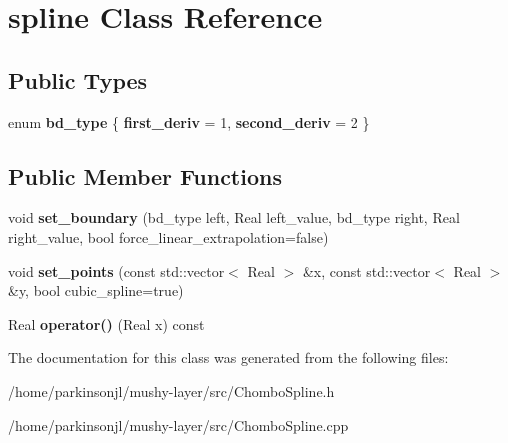 \hypertarget{classspline}{\section{spline Class Reference}
\label{classspline}
}
\subsection*{Public Types}
\begin{DoxyCompactItemize}
\item 
enum {\bfseries bd\-\_\-type} \{ {\bfseries first\-\_\-deriv} = 1, 
{\bfseries second\-\_\-deriv} = 2
 \}
\end{DoxyCompactItemize}
\subsection*{Public Member Functions}
\begin{DoxyCompactItemize}
\item 
\hypertarget{classspline_a8faa0e24c31c45b976606e1376e2eff2}{void {\bfseries set\-\_\-boundary} (bd\-\_\-type left, Real left\-\_\-value, bd\-\_\-type right, Real right\-\_\-value, bool force\-\_\-linear\-\_\-extrapolation=false)}\label{classspline_a8faa0e24c31c45b976606e1376e2eff2}

\item 
\hypertarget{classspline_abfb0f9a39a5c59e72aa59e0f1ce8cc6d}{void {\bfseries set\-\_\-points} (const std\-::vector$<$ Real $>$ \&x, const std\-::vector$<$ Real $>$ \&y, bool cubic\-\_\-spline=true)}\label{classspline_abfb0f9a39a5c59e72aa59e0f1ce8cc6d}

\item 
\hypertarget{classspline_a89cf037a96ee3d16af5f4d640e8e5b04}{Real {\bfseries operator()} (Real x) const }\label{classspline_a89cf037a96ee3d16af5f4d640e8e5b04}

\end{DoxyCompactItemize}


The documentation for this class was generated from the following files\-:\begin{DoxyCompactItemize}
\item 
/home/parkinsonjl/mushy-\/layer/src/Chombo\-Spline.\-h\item 
/home/parkinsonjl/mushy-\/layer/src/Chombo\-Spline.\-cpp\end{DoxyCompactItemize}
